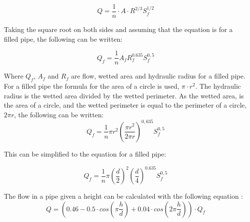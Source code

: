 \begin{equation}
	Q=\frac{1}{n} \cdot A\cdot R^{2/3} S_f^{1/2}			
\end{equation}

 Taking the square root on both sides and assuming that the equation is for a filled pipe, the following can be written:

\begin{equation}
  Q_{f} = \frac{1}{n} A_{f} R_{f}^{0.635}S_f^{0,5} 
\end{equation}


Where $Q_f$, $A_f$ and $R_f$ are flow, wetted area and hydraulic radius for a filled pipe. For a filled pipe the formula for the area of a circle is used, $\pi \cdot r^2$. The hydraulic radius is the wetted area divided by the wetted perimeter. As the wetted area, is the area of a circle, and the wetted perimeter is equal to the perimeter of a circle, $2\pi r$, the following can be written: 
\begin{equation}
		Q_{f}= \frac{1}{n}\pi r^2\left(\frac{\pi r^2}{2\pi r}\right)^{0,635} S_f^{0,5} 
\end{equation}

This can be simplified to the equation for a filled pipe:

\begin{equation}%
	Q_{f} =\frac{1}{n}\pi\left(\frac{d}{2}\right)^2\left(\frac{d}{4}\right)^{0.635} S_f^{0,5}%
\end{equation}


The flow in a pipe given a height can be calculated with the following equation \cite{ikke_stationear}:
\begin{equation}%
 	Q = \left(0.46-0.5 \cdot cos\left(\pi \frac{h}{d}\right)+0.04\cdot cos\left(2\pi\frac{h}{d}\right)\right)\cdot Q_f
\end{equation}

